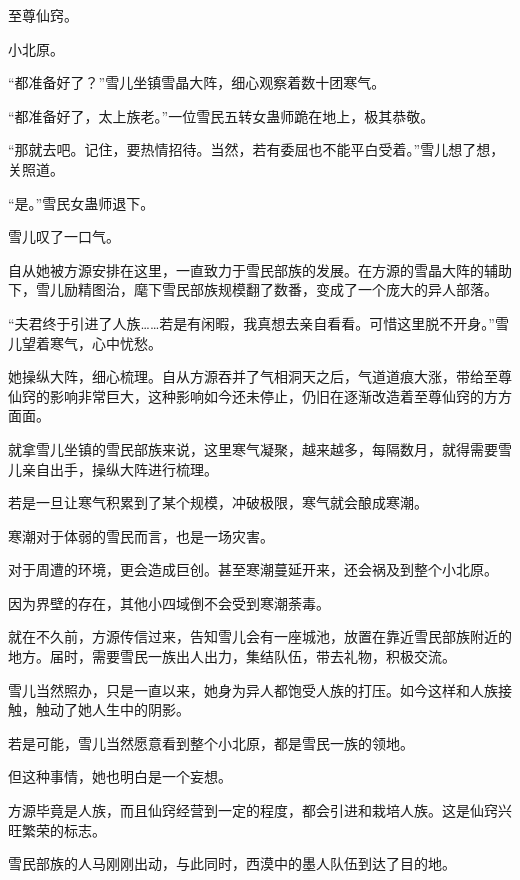 
\begin{this_body}



至尊仙窍。

小北原。

“都准备好了？”雪儿坐镇雪晶大阵，细心观察着数十团寒气。

“都准备好了，太上族老。”一位雪民五转女蛊师跪在地上，极其恭敬。

“那就去吧。记住，要热情招待。当然，若有委屈也不能平白受着。”雪儿想了想，关照道。

“是。”雪民女蛊师退下。

雪儿叹了一口气。

自从她被方源安排在这里，一直致力于雪民部族的发展。在方源的雪晶大阵的辅助下，雪儿励精图治，麾下雪民部族规模翻了数番，变成了一个庞大的异人部落。

“夫君终于引进了人族……若是有闲暇，我真想去亲自看看。可惜这里脱不开身。”雪儿望着寒气，心中忧愁。

她操纵大阵，细心梳理。自从方源吞并了气相洞天之后，气道道痕大涨，带给至尊仙窍的影响非常巨大，这种影响如今还未停止，仍旧在逐渐改造着至尊仙窍的方方面面。

就拿雪儿坐镇的雪民部族来说，这里寒气凝聚，越来越多，每隔数月，就得需要雪儿亲自出手，操纵大阵进行梳理。

若是一旦让寒气积累到了某个规模，冲破极限，寒气就会酿成寒潮。

寒潮对于体弱的雪民而言，也是一场灾害。

对于周遭的环境，更会造成巨创。甚至寒潮蔓延开来，还会祸及到整个小北原。

因为界壁的存在，其他小四域倒不会受到寒潮荼毒。

就在不久前，方源传信过来，告知雪儿会有一座城池，放置在靠近雪民部族附近的地方。届时，需要雪民一族出人出力，集结队伍，带去礼物，积极交流。

雪儿当然照办，只是一直以来，她身为异人都饱受人族的打压。如今这样和人族接触，触动了她人生中的阴影。

若是可能，雪儿当然愿意看到整个小北原，都是雪民一族的领地。

但这种事情，她也明白是一个妄想。

方源毕竟是人族，而且仙窍经营到一定的程度，都会引进和栽培人族。这是仙窍兴旺繁荣的标志。

雪民部族的人马刚刚出动，与此同时，西漠中的墨人队伍到达了目的地。


\end{this_body}
